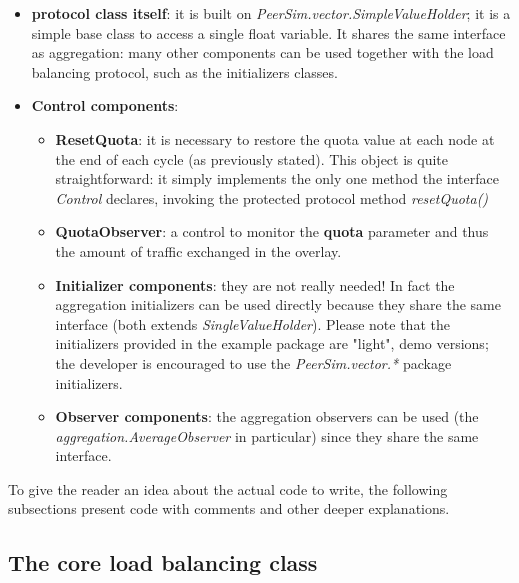 \documentclass[a4paper,11pt]{article}
\begin{document}
\begin{itemize}
\item \textbf{protocol class itself}: it is built on
  \emph{PeerSim.vector.SimpleValueHolder}; it is a simple base class
  to access a single float variable. It shares the same interface as
  aggregation: many other components can be used together with the
  load balancing protocol, such as the initializers classes. 

\item \textbf{Control components}: 

\begin{itemize}

\item \textbf{ResetQuota}: it is necessary to restore the quota value
  at each node at the end of each cycle (as previously stated). This
  object is quite straightforward: it simply implements the only one
  method the interface \emph{Control} declares, invoking the protected
  protocol method \emph{resetQuota()}

\item \textbf{QuotaObserver}: a control to monitor the \textbf{quota}
  parameter and thus the amount of traffic exchanged in the overlay. 

\item \textbf{Initializer components}: they are not really needed!
 In fact the aggregation initializers can be used directly because they
 share the same interface (both extends \emph{SingleValueHolder}).
Please note that the initializers provided in the example package are
"light", demo versions; the developer is encouraged to use the
\emph{PeerSim.vector.*} package initializers. 

\item \textbf{Observer components}: the aggregation observers can be
  used (the \emph{aggregation.AverageObserver} in particular) since
  they share the same interface.

\end{itemize}

\end{itemize}
To give the reader an idea about the actual code to write, the following
subsections present code with comments and other deeper explanations.

\subsection{The core load balancing class}
\end{document}
